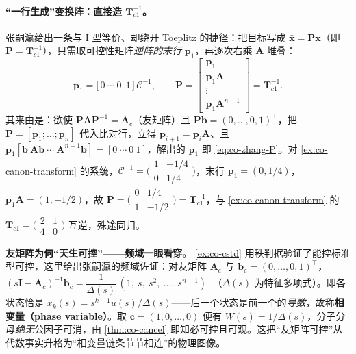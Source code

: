 \paragraph{“一行生成”变换阵：直接造 \texorpdfstring{$\mathbf{T}_{c1}^{-1}$}{Tc1 inverse}。}
张嗣瀛给出一条与 I 型等价、却绕开 Toeplitz 的捷径\cite{zhang2017modern}：把目标写成 $\bar{\mathbf{x}}=\mathbf{P}\mathbf{x}$（即 $\mathbf{P}=\mathbf{T}_{c1}^{-1}$），只需取可控性矩阵\emph{逆阵的末行} $\mathbf{p}_1$，再逐次右乘 $\mathbf{A}$ 堆叠：
\begin{equation}
  \mathbf{p}_1=\big[\,0\ \cdots\ 0\ \ 1\,\big]\,\mathcal{C}^{-1},\qquad
  \mathbf{P}=\begin{bmatrix}\mathbf{p}_1\\ \mathbf{p}_1\mathbf{A}\\ \vdots\\ \mathbf{p}_1\mathbf{A}^{n-1}\end{bmatrix}=\mathbf{T}_{c1}^{-1}.
  \label{eq:co-zhang-P}
\end{equation}
其来由是：欲使 $\mathbf{P}\mathbf{A}\mathbf{P}^{-1}=\mathbf{A}_c$（友矩阵）且 $\mathbf{P}\mathbf{b}=(0,\dots,0,1)^\top$，把 $\mathbf{P}=[\mathbf{p}_1;\dots;\mathbf{p}_n]^{}$ 代入比对行，立得 $\mathbf{p}_{i+1}=\mathbf{p}_i\mathbf{A}$、且 $\mathbf{p}_1[\mathbf{b}\ \mathbf{A}\mathbf{b}\ \cdots\ \mathbf{A}^{n-1}\mathbf{b}]=[0\ \cdots\ 0\ 1]$，解出的 $\mathbf{p}_1$ 即 \cref{eq:co-zhang-P}\cite{zhang2017modern}。对 \cref{ex:co-canon-transform} 的系统，$\mathcal{C}^{-1}=\big(\begin{smallmatrix}1&-1/4\\0&1/4\end{smallmatrix}\big)$，末行 $\mathbf{p}_1=(0,1/4)$，$\mathbf{p}_1\mathbf{A}=(1,-1/2)$，故 $\mathbf{P}=\big(\begin{smallmatrix}0&1/4\\1&-1/2\end{smallmatrix}\big)=\mathbf{T}_{c1}^{-1}$，与 \cref{ex:co-canon-transform} 的 $\mathbf{T}_{c1}=\big(\begin{smallmatrix}2&1\\4&0\end{smallmatrix}\big)$ 互逆，殊途同归。

\begin{insight}
\textbf{友矩阵为何“天生可控”——频域一眼看穿。}\;
\cref{ex:co-cstd} 用秩判据验证了能控标准型可控，这里给出张嗣瀛的频域佐证\cite{zhang2017modern}：对友矩阵 $\mathbf{A}_c$ 与 $\mathbf{b}_c=(0,\dots,0,1)^\top$，$(s\mathbf{I}-\mathbf{A}_c)^{-1}\mathbf{b}_c=\dfrac{1}{\Delta(s)}\,(1,\ s,\ s^2,\ \dots,\ s^{n-1})^\top$（$\Delta(s)$ 为特征多项式）。即各状态恰是 $x_k(s)=s^{k-1}u(s)/\Delta(s)$——后一个状态是前一个的\emph{导数}，故称\textbf{相变量（phase variable）}。取 $\mathbf{c}=(1,0,\dots,0)$ 便有 $W(s)=1/\Delta(s)$，分子分母\emph{绝无}公因子可消，由 \cref{thm:co-cancel} 即知必可控且可观。这把“友矩阵可控”从代数事实升格为“相变量链条节节相连”的物理图像。
\end{insight}

